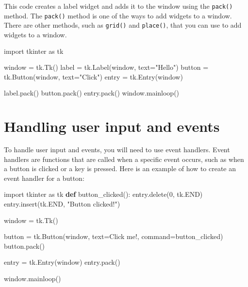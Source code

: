 \documentclass[11pt]{article}
\newenvironment{Shaded}{}{}
\newcommand{\KeywordTok}[1]{\textcolor[rgb]{0.00,0.44,0.13}{\textbf{{#1}}}}
\newcommand{\DecValTok}[1]{\textcolor[rgb]{0.25,0.63,0.44}{{#1}}}
\newcommand{\StringTok}[1]{\textcolor[rgb]{0.25,0.44,0.63}{{#1}}}
\newcommand{\NormalTok}[1]{{#1}}
\newcommand{\ImportTok}[1]{{#1}}
\newcommand{\OperatorTok}[1]{\textcolor[rgb]{0.40,0.40,0.40}{{#1}}}
\begin{document}
This code creates a label widget and adds it to the window using the
\texttt{pack()} method. The \texttt{pack()} method is one of the ways to
add widgets to a window. There are other methods, such as
\texttt{grid()} and \texttt{place()}, that you can use to add widgets to
a window.

\begin{Shaded}
\begin{Highlighting}[]
\ImportTok{import}\NormalTok{ tkinter }\ImportTok{as}\NormalTok{ tk}

\NormalTok{window }\OperatorTok{=}\NormalTok{ tk.Tk()}
\NormalTok{label }\OperatorTok{=}\NormalTok{ tk.Label(window, text}\OperatorTok{=}\StringTok{"Hello"}\NormalTok{) }
\NormalTok{button }\OperatorTok{=}\NormalTok{ tk.Button(window, text}\OperatorTok{=}\StringTok{"Click"}\NormalTok{)}
\NormalTok{entry }\OperatorTok{=}\NormalTok{ tk.Entry(window)}

\NormalTok{label.pack()}
\NormalTok{button.pack()}
\NormalTok{entry.pack()    }
\NormalTok{window.mainloop()}
\end{Highlighting}
\end{Shaded}

\section{Handling user input and events}\label{handling-user-input-and-events}

To handle user input and events, you will need to use event handlers.
Event handlers are functions that are called when a specific event
occurs, such as when a button is clicked or a key is pressed. Here is an
example of how to create an event handler for a button:

\begin{Shaded}
\begin{Highlighting}[]
\ImportTok{import}\NormalTok{ tkinter }\ImportTok{as}\NormalTok{ tk}
\KeywordTok{def}\NormalTok{ button\_clicked():}
\NormalTok{    entry.delete(}\DecValTok{0}\NormalTok{, tk.END)}
\NormalTok{    entry.insert(tk.END, }\StringTok{"Button clicked!"}\NormalTok{)}

\NormalTok{window }\OperatorTok{=}\NormalTok{ tk.Tk()}

\NormalTok{button }\OperatorTok{=}\NormalTok{ tk.Button(window, text}\OperatorTok{=}\StringTok{\textquotesingle{}Click me!\textquotesingle{}}\NormalTok{, command}\OperatorTok{=}\NormalTok{button\_clicked)}
\NormalTok{button.pack()}

\NormalTok{entry }\OperatorTok{=}\NormalTok{ tk.Entry(window)}
\NormalTok{entry.pack()}

\NormalTok{window.mainloop()}
\end{Highlighting}
\end{Shaded}
\end{document}
